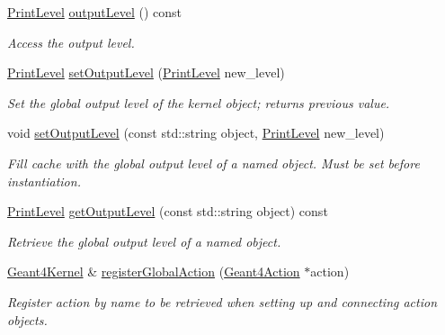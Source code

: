 \begin{DoxyCompactItemize}
\hyperlink{namespace_d_d4hep_a5b5a64d56252469451f2020a27d57d42}{Print\+Level} \hyperlink{class_d_d4hep_1_1_simulation_1_1_geant4_kernel_aaaddf1d35de3dcb63d569e4ec8a7e4c6}{output\+Level} () const
\begin{DoxyCompactList}\small\item\em Access the output level. \end{DoxyCompactList}\item 
\hyperlink{namespace_d_d4hep_a5b5a64d56252469451f2020a27d57d42}{Print\+Level} \hyperlink{class_d_d4hep_1_1_simulation_1_1_geant4_kernel_abf3fb3881f4e504ab8c4b14aa17ac7c8}{set\+Output\+Level} (\hyperlink{namespace_d_d4hep_a5b5a64d56252469451f2020a27d57d42}{Print\+Level} new\+\_\+level)
\begin{DoxyCompactList}\small\item\em Set the global output level of the kernel object; returns previous value. \end{DoxyCompactList}\item 
void \hyperlink{class_d_d4hep_1_1_simulation_1_1_geant4_kernel_aa2a86e9223fa508132a57669fab477d5}{set\+Output\+Level} (const std\+::string object, \hyperlink{namespace_d_d4hep_a5b5a64d56252469451f2020a27d57d42}{Print\+Level} new\+\_\+level)
\begin{DoxyCompactList}\small\item\em Fill cache with the global output level of a named object. Must be set before instantiation. \end{DoxyCompactList}\item 
\hyperlink{namespace_d_d4hep_a5b5a64d56252469451f2020a27d57d42}{Print\+Level} \hyperlink{class_d_d4hep_1_1_simulation_1_1_geant4_kernel_adcf47e98a5cff7d2ddf235753f907a63}{get\+Output\+Level} (const std\+::string object) const
\begin{DoxyCompactList}\small\item\em Retrieve the global output level of a named object. \end{DoxyCompactList}\item 
\hyperlink{class_d_d4hep_1_1_simulation_1_1_geant4_kernel}{Geant4\+Kernel} \& \hyperlink{class_d_d4hep_1_1_simulation_1_1_geant4_kernel_a8792d3d0db403a52fe6495456b45c97a}{register\+Global\+Action} (\hyperlink{class_d_d4hep_1_1_simulation_1_1_geant4_action}{Geant4\+Action} $\ast$action)
\begin{DoxyCompactList}\small\item\em Register action by name to be retrieved when setting up and connecting action objects. \end{DoxyCompactList}\item 

\end{DoxyCompactItemize}
